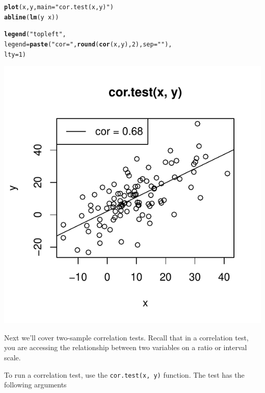 \documentclass{tufte-book}\usepackage[]{graphicx}\usepackage[]{color}
\makeatletter
\def\maxwidth{ %
  \ifdim\Gin@nat@width>\linewidth
    \linewidth
  \else
    \Gin@nat@width
  \fi
}
\newcommand{\hlnum}[1]{\textcolor[rgb]{0.686,0.059,0.569}{#1}}%
\newcommand{\hlstr}[1]{\textcolor[rgb]{0.192,0.494,0.8}{#1}}%
\newcommand{\hlopt}[1]{\textcolor[rgb]{0,0,0}{#1}}%
\newcommand{\hlstd}[1]{\textcolor[rgb]{0.345,0.345,0.345}{#1}}%
\newcommand{\hlkwc}[1]{\textcolor[rgb]{0.333,0.667,0.333}{#1}}%
\newcommand{\hlkwd}[1]{\textcolor[rgb]{0.737,0.353,0.396}{\textbf{#1}}}%
\newenvironment{kframe}{%
 \def\at@end@of@kframe{}%
 \ifinner\ifhmode%
  \def\at@end@of@kframe{\end{minipage}}%
  \begin{minipage}{\columnwidth}%
 \fi\fi%
 \def\FrameCommand##1{\hskip\@totalleftmargin \hskip-\fboxsep
 \colorbox{shadecolor}{##1}\hskip-\fboxsep
     \hskip-\linewidth \hskip-\@totalleftmargin \hskip\columnwidth}%
 \MakeFramed {\advance\hsize-\width
   \@totalleftmargin\z@ \linewidth\hsize
   \@setminipage}}%
 {\par\unskip\endMakeFramed%
 \at@end@of@kframe}
\newenvironment{knitrout}{}{} %
\makeatother
\begin{document}
\begin{footnotesize}
\begin{marginfigure}
\begin{tiny}
\begin{knitrout}
\begin{kframe}
\begin{alltt}
\hlkwd{plot}\hlstd{(x, y,} \hlkwc{main} \hlstd{=} \hlstr{"cor.test(x, y)"}\hlstd{)}
\hlkwd{abline}\hlstd{(}\hlkwd{lm}\hlstd{(y} \hlopt{~} \hlstd{x))}

\hlkwd{legend}\hlstd{(}\hlstr{"topleft"}\hlstd{,}
       \hlkwc{legend} \hlstd{=} \hlkwd{paste}\hlstd{(}\hlstr{"cor = "}\hlstd{,} \hlkwd{round}\hlstd{(}\hlkwd{cor}\hlstd{(x, y),} \hlnum{2}\hlstd{),} \hlkwc{sep} \hlstd{=} \hlstr{""}\hlstd{),}
       \hlkwc{lty} \hlstd{=} \hlnum{1}\hlstd{)}
\end{alltt}
\end{kframe}
\includegraphics[width=\maxwidth]{figure/unnamed-chunk-231-1} 

\end{knitrout}
\end{tiny}
\end{marginfigure}


Next we'll cover two-sample correlation tests. Recall that in a correlation test, you are accessing the relationship between two variables on a ratio or interval scale.

To run a correlation test, use the \texttt{cor.test(x, y)} function. The test has the following arguments



\end{footnotesize}
\end{document}

